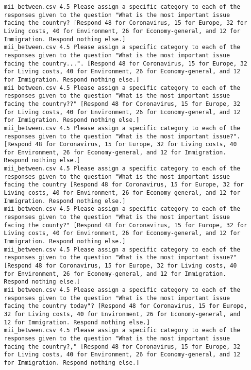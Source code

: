 \begin{lstlisting}
mii_between.csv	4.5	Please assign a specific category to each of the responses given to the question "What is the most important issue facing the country? [Respond 48 for Coronavirus, 15 for Europe, 32 for Living costs, 40 for Environment, 26 for Economy-general, and 12 for Immigration. Respond nothing else.]
mii_between.csv	4.5	Please assign a specific category to each of the responses given to the question "What is the most important issue facing the country...". [Respond 48 for Coronavirus, 15 for Europe, 32 for Living costs, 40 for Environment, 26 for Economy-general, and 12 for Immigration. Respond nothing else.]
mii_between.csv	4.5	Please assign a specific category to each of the responses given to the question "What is the most important issue facing the country??" [Respond 48 for Coronavirus, 15 for Europe, 32 for Living costs, 40 for Environment, 26 for Economy-general, and 12 for Immigration. Respond nothing else.]
mii_between.csv	4.5	Please assign a specific category to each of the responses given to the question "What is the most important issue?". [Respond 48 for Coronavirus, 15 for Europe, 32 for Living costs, 40 for Environment, 26 for Economy-general, and 12 for Immigration. Respond nothing else.]
mii_between.csv	4.5	Please assign a specific category to each of the responses given to the question "What is the most important issue facing the country [Respond 48 for Coronavirus, 15 for Europe, 32 for Living costs, 40 for Environment, 26 for Economy-general, and 12 for Immigration. Respond nothing else.]
mii_between.csv	4.5	Please assign a specific category to each of the responses given to the question "What is the most important issue facing the county?" [Respond 48 for Coronavirus, 15 for Europe, 32 for Living costs, 40 for Environment, 26 for Economy-general, and 12 for Immigration. Respond nothing else.]
mii_between.csv	4.5	Please assign a specific category to each of the responses given to the question "What is the most important issue?" [Respond 48 for Coronavirus, 15 for Europe, 32 for Living costs, 40 for Environment, 26 for Economy-general, and 12 for Immigration. Respond nothing else.]
mii_between.csv	4.5	Please assign a specific category to each of the responses given to the question "What is the most important issue facing the country today"? [Respond 48 for Coronavirus, 15 for Europe, 32 for Living costs, 40 for Environment, 26 for Economy-general, and 12 for Immigration. Respond nothing else.]
mii_between.csv	4.5	Please assign a specific category to each of the responses given to the question "What is the most important issue facing the country?," [Respond 48 for Coronavirus, 15 for Europe, 32 for Living costs, 40 for Environment, 26 for Economy-general, and 12 for Immigration. Respond nothing else.]

\end{lstlisting}
